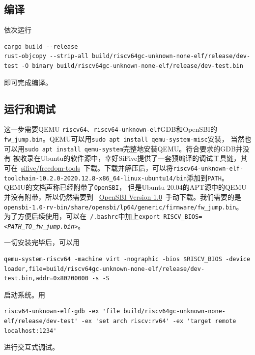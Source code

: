\documentclass{../runikraft-report}
\begin{document}
\subsection{编译}
依次运行
\begin{lstlisting}
cargo build --release
rust-objcopy --strip-all build/riscv64gc-unknown-none-elf/release/dev-test -O binary build/riscv64gc-unknown-none-elf/release/dev-test.bin
\end{lstlisting}
即可完成编译。

\subsection{运行和调试}
这一步需要QEMU \texttt{riscv64}、\texttt{riscv64-unknown-elf}GDB和OpenSBI的
\texttt{fw\_jump.bin}。QEMU可以用\texttt{sudo apt install qemu-system-misc}安装，
当然也可以用\texttt{sudo apt install qemu-system}完整地安装QEMU。符合要求的GDB并没有
被收录在Ubuntu的软件源中，幸好SiFive提供了一套预编译的调试工具链，其可在\
\href{https://github.com/sifive/freedom-tools/releases}{sifive/freedom-tools}\
下载。下载并解压后，可以将\texttt{riscv64-unknown-elf-toolchain-10.2.0-2020.12.8-x86\_64-linux-ubuntu14/bin}添加到\texttt{PATH}。
QEMU的文档声称已经附带了\texttt{OpenSBI}\cite{qemu-virt}，
但是Ubuntu 20.04的APT源中的QEMU并没有附带，所以仍然需要到
\ \href{https://github.com/riscv-software-src/opensbi/releases/tag/v1.0}{OpenSBI Version 1.0}\
手动下载。我们需要的是\linebreak\texttt{opensbi-1.0-rv-bin/share/opensbi/lp64/generic/firmware/fw\_jump.bin}。
为了方便后续使用，可以在\texttt{~/.bashrc}中加上\texttt{export RISCV\_BIOS=\textit{<PATH\_TO\_fw\_jump.bin>}}。

一切安装完毕后，可以用
\begin{lstlisting}
qemu-system-riscv64 -machine virt -nographic -bios $RISCV_BIOS -device loader,file=build/riscv64gc-unknown-none-elf/release/dev-test.bin,addr=0x80200000 -s -S
\end{lstlisting}
启动系统。用
\begin{lstlisting}
riscv64-unknown-elf-gdb -ex 'file build/riscv64gc-unknown-none-elf/release/dev-test' -ex 'set arch riscv:rv64' -ex 'target remote localhost:1234'
\end{lstlisting}
进行交互式调试。
\end{document}
